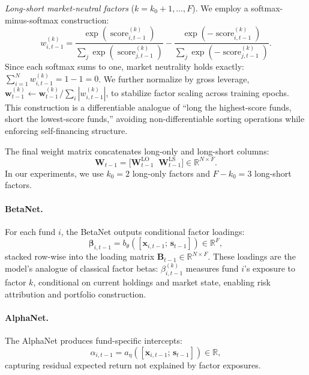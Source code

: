 \emph{Long-short market-neutral factors} ($k = k_0+1, \ldots, F$). We employ a softmax-minus-softmax construction:
\begin{equation}\label{eq:long-short}
    w_{i,t-1}^{(k)} = \frac{\exp\!\left(\operatorname{score}_{i,t-1}^{(k)}\right)}{\sum_{j} \exp\!\left(\operatorname{score}_{j,t-1}^{(k)}\right)} - \frac{\exp\!\left(-\operatorname{score}_{i,t-1}^{(k)}\right)}{\sum_{j} \exp\!\left(-\operatorname{score}_{j,t-1}^{(k)}\right)}.
\end{equation}
Since each softmax sums to one, market neutrality holds exactly: $\sum_{i=1}^{N} w_{i,t-1}^{(k)} = 1 - 1 = 0$. We further normalize by gross leverage, $\mathbf{w}_{t-1}^{(k)} \leftarrow \mathbf{w}_{t-1}^{(k)} \big/ \sum_{i} |w_{i,t-1}^{(k)}|$, to stabilize factor scaling across training epochs. This construction is a differentiable analogue of ``long the highest-score funds, short the lowest-score funds,'' avoiding non-differentiable sorting operations while enforcing self-financing structure.

The final weight matrix concatenates long-only and long-short columns:
\begin{equation}\label{eq:weight-matrix}
    \mathbf{W}_{t-1} = \big[\mathbf{W}_{t-1}^{\mathrm{LO}} \;\; \mathbf{W}_{t-1}^{\mathrm{LS}}\big] \in \mathbb{R}^{N \times F}.
\end{equation}
In our experiments, we use $k_0 = 2$ long-only factors and $F - k_0 = 3$ long-short factors.

\paragraph{BetaNet.} For each fund $i$, the BetaNet outputs conditional factor loadings:
\begin{equation}\label{eq:betanet}
    \boldsymbol{\beta}_{i,t-1} = b_\theta\!\left([\mathbf{x}_{i,t-1};\, \mathbf{s}_{t-1}]\right) \in \mathbb{R}^{F},
\end{equation}
stacked row-wise into the loading matrix $\mathbf{B}_{t-1} \in \mathbb{R}^{N \times F}$. These loadings are the model's analogue of classical factor betas: $\beta_{i,t-1}^{(k)}$ measures fund $i$'s exposure to factor $k$, conditional on current holdings and market state, enabling risk attribution and portfolio construction.

\paragraph{AlphaNet.} The AlphaNet produces fund-specific intercepts:
\begin{equation}\label{eq:alphanet}
    \alpha_{i,t-1} = a_\eta\!\left([\mathbf{x}_{i,t-1};\, \mathbf{s}_{t-1}]\right) \in \mathbb{R},
\end{equation}
capturing residual expected return not explained by factor exposures.

